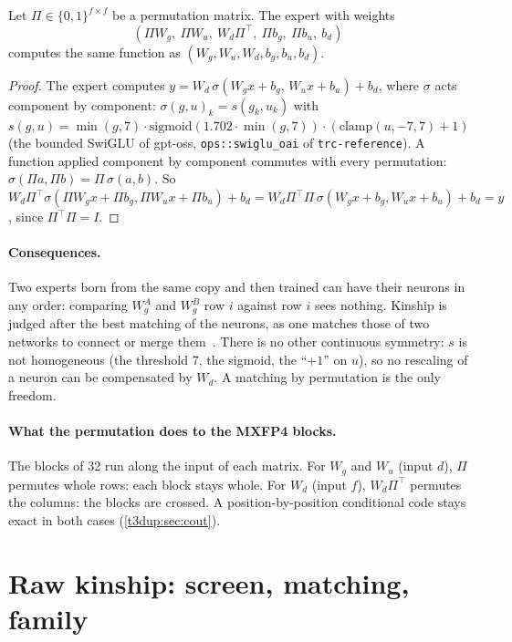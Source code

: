 \begin{proposition}\label{t3dup:prop:permutation}
Let $\Pi \in \{0,1\}^{f \times f}$ be a permutation matrix. The expert with weights
\[ (\Pi W_g,\ \Pi W_u,\ W_d \Pi^\top,\ \Pi b_g,\ \Pi b_u,\ b_d) \]
computes the same function as $(W_g, W_u, W_d, b_g, b_u, b_d)$.
\end{proposition}

\begin{proof}
The expert computes $y = W_d\, \sigma(W_g x + b_g,\, W_u x + b_u) + b_d$, where $\sigma$ acts component by component: $\sigma(g, u)_k = s(g_k, u_k)$ with $s(g, u) = \min(g, 7)\cdot\mathrm{sigmoid}(1.702\cdot\min(g, 7))\cdot(\mathrm{clamp}(u, -7, 7) + 1)$ (the bounded SwiGLU of gpt-oss, \texttt{ops::swiglu\_oai} of \texttt{trc-reference}). A function applied component by component commutes with every permutation: $\sigma(\Pi a, \Pi b) = \Pi\,\sigma(a, b)$. So $W_d \Pi^\top \sigma(\Pi W_g x + \Pi b_g, \Pi W_u x + \Pi b_u) + b_d = W_d \Pi^\top \Pi\, \sigma(W_g x + b_g, W_u x + b_u) + b_d = y$, since $\Pi^\top \Pi = I$.
\end{proof}

\paragraph{Consequences.} Two experts born from the same copy and then trained can have their neurons in any order: comparing $W_g^A$ and $W_g^B$ row $i$ against row $i$ sees nothing. Kinship is judged after the best matching of the neurons, as one matches those of two networks to connect or merge them~\cite{ainsworth2022rebasin,entezari2021permutation}. There is no other continuous symmetry: $s$ is not homogeneous (the threshold 7, the sigmoid, the ``$+1$'' on $u$), so no rescaling of a neuron can be compensated by $W_d$. A matching by permutation is the only freedom.

\paragraph{What the permutation does to the MXFP4 blocks.} The blocks of 32 run along the input of each matrix. For $W_g$ and $W_u$ (input $d$), $\Pi$ permutes whole rows: each block stays whole. For $W_d$ (input $f$), $W_d \Pi^\top$ permutes the columns: the blocks are crossed. A position-by-position conditional code stays exact in both cases (\cref{t3dup:sec:cout}).

\section{Raw kinship: screen, matching, family}\label{t3dup:sec:parente}

